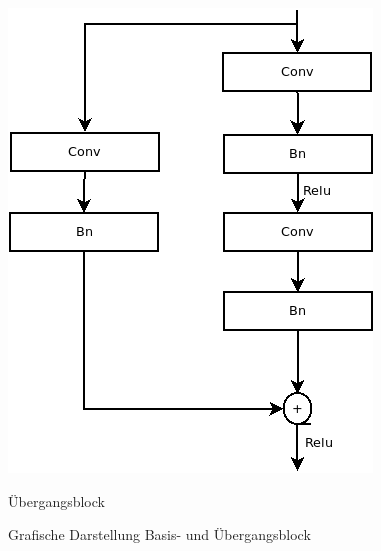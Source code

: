\begin{figure}[]
\begin{minipage}[b]{.4\linewidth}
      \includegraphics[width=0.8\linewidth]{KapitelPartB/Images/Ubergangsblock.png}
      \caption{Übergangsblock}
   \end{minipage}
   \caption{Grafische Darstellung Basis- und Übergangsblock}
   \label{abb:blocks}
\end{figure}


